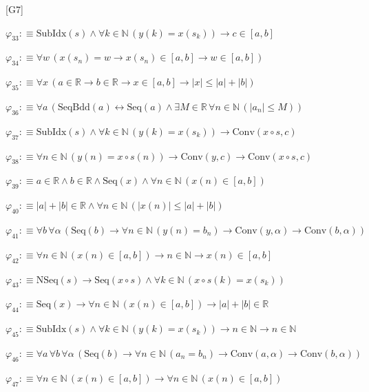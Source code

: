 \begin{fullproof}{[G7]}
\begin{abbrevlist}
\item $\varphi_{33} :\equiv \mathrm{SubIdx}(s) \land \forall k \in \mathbb{N}\,(y(k) = x(s_{k})) \to c \in [a,b]$
\item $\varphi_{34} :\equiv \forall w\,(x(s_{n}) = w \to x(s_{n}) \in [a,b] \to w \in [a,b])$
\item $\varphi_{35} :\equiv \forall x\,(a \in \mathbb{R} \to b \in \mathbb{R} \to x \in [a,b] \to \lvert x \rvert \leq \lvert a \rvert + \lvert b \rvert)$
\item $\varphi_{36} :\equiv \forall a\,(\mathrm{SeqBdd}(a) \leftrightarrow \mathrm{Seq}(a) \land \exists M \in \mathbb{R}\,\forall n \in \mathbb{N}\,(\lvert a_{n} \rvert \leq M))$
\item $\varphi_{37} :\equiv \mathrm{SubIdx}(s) \land \forall k \in \mathbb{N}\,(y(k) = x(s_{k})) \to \mathrm{Conv}(x \circ s,c)$
\item $\varphi_{38} :\equiv \forall n \in \mathbb{N}\,(y(n) = x \circ s(n)) \to \mathrm{Conv}(y,c) \to \mathrm{Conv}(x \circ s,c)$
\item $\varphi_{39} :\equiv a \in \mathbb{R} \land b \in \mathbb{R} \land \mathrm{Seq}(x) \land \forall n \in \mathbb{N}\,(x(n) \in [a,b])$
\item $\varphi_{40} :\equiv \lvert a \rvert + \lvert b \rvert \in \mathbb{R} \land \forall n \in \mathbb{N}\,(\lvert x(n) \rvert \leq \lvert a \rvert + \lvert b \rvert)$
\item $\varphi_{41} :\equiv \forall b\,\forall \alpha\,(\mathrm{Seq}(b) \to \forall n \in \mathbb{N}\,(y(n) = b_{n}) \to \mathrm{Conv}(y,\alpha) \to \mathrm{Conv}(b,\alpha))$
\item $\varphi_{42} :\equiv \forall n \in \mathbb{N}\,(x(n) \in [a,b]) \to n \in \mathbb{N} \to x(n) \in [a,b]$
\item $\varphi_{43} :\equiv \mathrm{NSeq}(s) \to \mathrm{Seq}(x \circ s) \land \forall k \in \mathbb{N}\,(x \circ s(k) = x(s_{k}))$
\item $\varphi_{44} :\equiv \mathrm{Seq}(x) \to \forall n \in \mathbb{N}\,(x(n) \in [a,b]) \to \lvert a \rvert + \lvert b \rvert \in \mathbb{R}$
\item $\varphi_{45} :\equiv \mathrm{SubIdx}(s) \land \forall k \in \mathbb{N}\,(y(k) = x(s_{k})) \to n \in \mathbb{N} \to n \in \mathbb{N}$
\item $\varphi_{46} :\equiv \forall a\,\forall b\,\forall \alpha\,(\mathrm{Seq}(b) \to \forall n \in \mathbb{N}\,(a_{n} = b_{n}) \to \mathrm{Conv}(a,\alpha) \to \mathrm{Conv}(b,\alpha))$
\item $\varphi_{47} :\equiv \forall n \in \mathbb{N}\,(x(n) \in [a,b]) \to \forall n \in \mathbb{N}\,(x(n) \in [a,b])$

\end{abbrevlist}
\end{fullproof}

